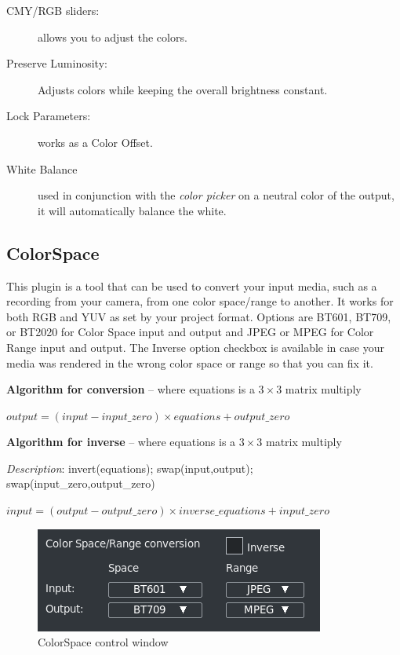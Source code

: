 \begin{description}
    \item[CMY/RGB sliders:] allows you to adjust the colors.
    \item[Preserve Luminosity:] Adjusts colors while keeping the overall brightness constant.
    \item[Lock Parameters:] works as a Color Offset.
    \item[White Balance] used in conjunction with the \textit{color picker} on a neutral color of the output, it will automatically balance the white.
\end{description}

\subsection{ColorSpace}%
\label{sub:color_space}

This plugin is a tool that can be used to convert your input media, such as a recording from your camera,
from one color space/range to another.  It works for both RGB and YUV as set by your project format.  
Options are BT601, BT709, or BT2020 for Color Space input and output and JPEG or MPEG for Color Range 
input and output.  The Inverse option checkbox is available in case your media was rendered in the wrong
color space  or range so that you can fix it.

\textbf{Algorithm for conversion} -- where equations is a $3\times3$ matrix multiply

\qquad $output = (input - input\_zero) \times equations + output\_zero$

\textbf{Algorithm for inverse}  -- where equations is a $3\times3$ matrix multiply

\textit{Description}:    invert(equations); swap(input,output); swap(input\_zero,output\_zero)

\qquad $input = (output - output\_zero) \times inverse\_equations + input\_zero$

\begin{figure}[hbtp]
    \centering
    \includegraphics[width=0.45\linewidth]{images/colorspace.png}
    \caption{ColorSpace control window}
    \label{fig:colorspace}
\end{figure}


